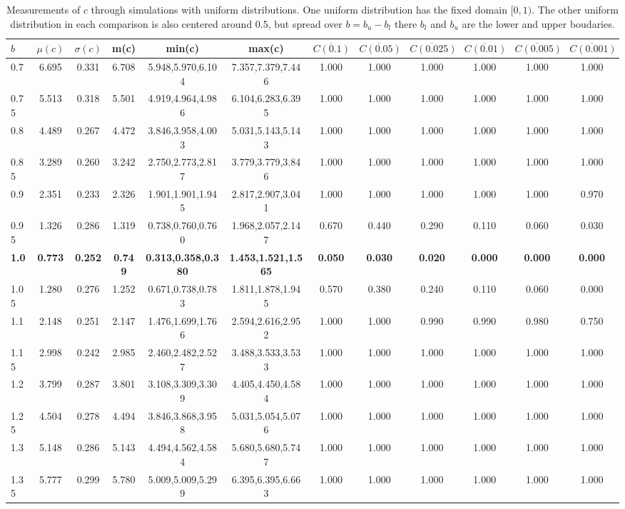 \begin{table*}[h!]
\begin{center}
\begin{tabular}{| l | c | c | c | c | c | c | c | c | c | c | c |}\hline
$b$ & $\mu(c)$ & $\sigma(c)$ & m(c) & min(c) & max(c) & $\overline{C(0.1)}$ & $\overline{C(0.05)}$ & $\overline{C(0.025)}$ & $\overline{C(0.01)}$ & $\overline{C(0.005)}$ & $\overline{C(0.001)}$ \\\hline\hline
0.7 & 6.695 & 0.331 & 6.708 & 5.948,5.970,6.104 & 7.357,7.379,7.446  & 1.000  & 1.000  & 1.000  & 1.000  & 1.000  & 1.000 \\\hline
0.75 & 5.513 & 0.318 & 5.501 & 4.919,4.964,4.986 & 6.104,6.283,6.395  & 1.000  & 1.000  & 1.000  & 1.000  & 1.000  & 1.000 \\\hline
0.8 & 4.489 & 0.267 & 4.472 & 3.846,3.958,4.003 & 5.031,5.143,5.143  & 1.000  & 1.000  & 1.000  & 1.000  & 1.000  & 1.000 \\\hline
0.85 & 3.289 & 0.260 & 3.242 & 2.750,2.773,2.817 & 3.779,3.779,3.846  & 1.000  & 1.000  & 1.000  & 1.000  & 1.000  & 1.000 \\\hline
0.9 & 2.351 & 0.233 & 2.326 & 1.901,1.901,1.945 & 2.817,2.907,3.041  & 1.000  & 1.000  & 1.000  & 1.000  & 1.000  & 0.970 \\\hline
0.95 & 1.326 & 0.286 & 1.319 & 0.738,0.760,0.760 & 1.968,2.057,2.147  & 0.670  & 0.440  & 0.290  & 0.110  & 0.060  & 0.030 \\\hline
{\bf 1.0} & {\bf 0.773} & {\bf 0.252} & {\bf 0.749} & {\bf 0.313,0.358,0.380} & {\bf 1.453,1.521,1.565} & {\bf 0.050} & {\bf 0.030} & {\bf 0.020} & {\bf 0.000} & {\bf 0.000} & {\bf 0.000} \\\hline
1.05 & 1.280 & 0.276 & 1.252 & 0.671,0.738,0.783 & 1.811,1.878,1.945  & 0.570  & 0.380  & 0.240  & 0.110  & 0.060  & 0.000 \\\hline
1.1 & 2.148 & 0.251 & 2.147 & 1.476,1.699,1.766 & 2.594,2.616,2.952  & 1.000  & 1.000  & 0.990  & 0.990  & 0.980  & 0.750 \\\hline
1.15 & 2.998 & 0.242 & 2.985 & 2.460,2.482,2.527 & 3.488,3.533,3.533  & 1.000  & 1.000  & 1.000  & 1.000  & 1.000  & 1.000 \\\hline
1.2 & 3.799 & 0.287 & 3.801 & 3.108,3.309,3.309 & 4.405,4.450,4.584  & 1.000  & 1.000  & 1.000  & 1.000  & 1.000  & 1.000 \\\hline
1.25 & 4.504 & 0.278 & 4.494 & 3.846,3.868,3.958 & 5.031,5.054,5.076  & 1.000  & 1.000  & 1.000  & 1.000  & 1.000  & 1.000 \\\hline
1.3 & 5.148 & 0.286 & 5.143 & 4.494,4.562,4.584 & 5.680,5.680,5.747  & 1.000  & 1.000  & 1.000  & 1.000  & 1.000  & 1.000 \\\hline
1.35 & 5.777 & 0.299 & 5.780 & 5.009,5.009,5.299 & 6.395,6.395,6.663  & 1.000  & 1.000  & 1.000  & 1.000  & 1.000  & 1.000 \\\hline
\end{tabular}
\caption{Measurements of $c$ through simulations
with uniform distributions.
One uniform distribution has the fixed domain $[0,1)$.
The other uniform distribution in each comparison
is also centered around 0.5,
but spread over $b=b_u-b_l$ there $b_l$ and $b_u$ are the lower and upper boudaries.}
\end{center}
\end{table*}